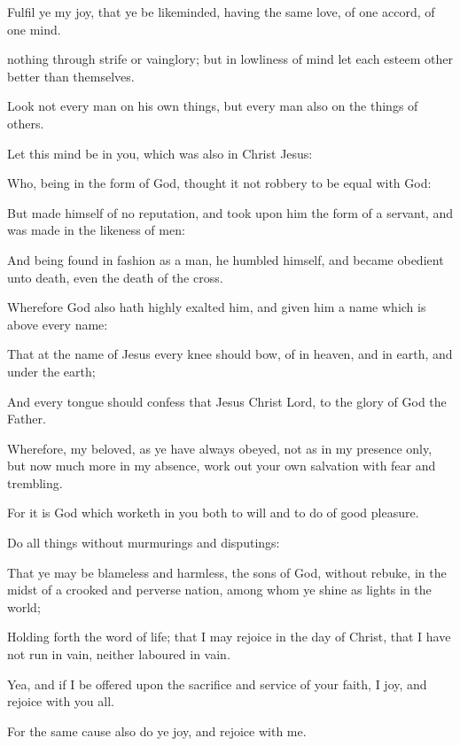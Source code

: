 {Fulfil
ye
my
joy,
that ye
be
likeminded,
having
the
same
love,
{} of one
accord,
of
one
mind.

nothing
{}
through
strife
or
vainglory;
but in lowliness of
mind
let
each
esteem
other
better than
themselves.

Look
not every
man on his own
things,
but every
man
also on the things of
others.

Let
this mind
be
in
you, which
was
also
in
Christ
Jesus:

Who,
being
in the
form of
God, thought
it
not
robbery to
be
equal with
God:

But
made
himself of no
reputation, and took upon
him the
form of a
servant, and was
made
in the
likeness of
men:

And being
found in
fashion
as a
man, he
humbled
himself, and
became
obedient
unto
death,
even the
death of the
cross.

Wherefore
God
also hath highly
exalted
him,
and
given
him a
name which
is
above
every
name:

That
at the
name of
Jesus
every
knee should
bow,
of
{} in
heaven,
and
{} in
earth,
and
{} under the
earth;

And
{}
every
tongue should
confess
that
Jesus
Christ
{}
Lord,
to the
glory of
God the
Father.


\par }{\PP {}Wherefore,
my
beloved,
as ye
have
always
obeyed,
not
as
in
my
presence
only,
but
now
much
more
in
my
absence, work
out your
own
salvation
with
fear
and
trembling.

For it
is
God
which
worketh
in
you
both to
will
and to
do
of
{} good
pleasure.

Do all
things
without
murmurings
and
disputings:

That ye may
be
blameless
and
harmless, the
sons of
God, without
rebuke,
in the
midst of
a
crooked
and
perverse
nation,
among
whom ye
shine
as
lights
in the
world;

Holding
forth the
word of
life;
that
I may
rejoice
in the
day of
Christ,
that I
have
not
run
in
vain,
neither
laboured
in
vain.

Yea,
and
if I be
offered
upon the
sacrifice
and
service
of
your
faith, I
joy,
and
rejoice with
you
all.

For the same
cause
also
do
ye
joy,
and rejoice
with
me.


}
